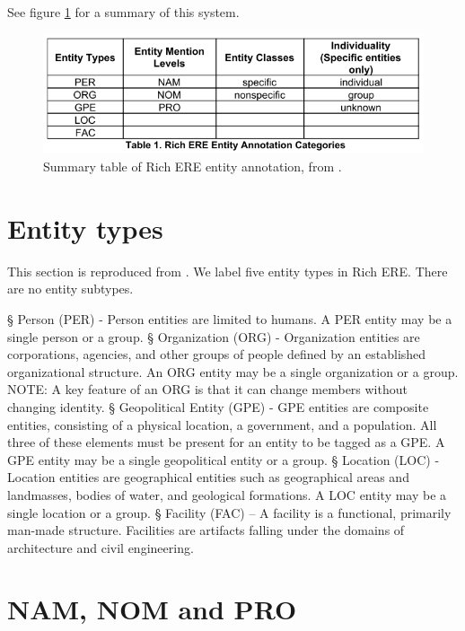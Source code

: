 See figure \ref{fig:rich_ere_ann_categories} for a summary of this system.

\begin{figure}[t]
\centering
\includegraphics[width=\textwidth]{img/rich_ere_ann_categories.png}
\caption{Summary table of Rich ERE entity annotation, from \cite{LDC2016.rich_ere}.}
\label{fig:rich_ere_ann_categories}
\end{figure}


\section{Entity types}

This section is reproduced from \cite{LDC2016.rich_ere}. We label five entity types in Rich ERE. There are no entity subtypes.

\begin{el}
    § Person (PER) - Person entities are limited to humans. A PER entity may be a single person or a group.
    § Organization (ORG) - Organization entities are corporations, agencies, and other groups of people defined by an established organizational structure. An ORG entity may be a single organization or a group. NOTE: A key feature of an ORG is that it can change members without changing identity.
    § Geopolitical Entity (GPE) - GPE entities are composite entities, consisting of a physical location, a government, and a population. All three of these elements must be present for an entity to be tagged as a GPE. A GPE entity may be a single geopolitical entity or a group.
    § Location (LOC) - Location entities are geographical entities such as geographical areas and landmasses, bodies of water, and geological formations. A LOC entity may be a single location or a group.
    § Facility (FAC) – A facility is a functional, primarily man-made structure. Facilities are artifacts falling under the domains of architecture and civil engineering.
\end{el}



\section{NAM, NOM and PRO}

